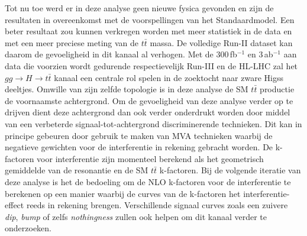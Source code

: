 Tot nu toe werd er in deze analyse geen nieuwe fysica gevonden en zijn
de resultaten in overeenkomst met de voorspellingen van het
Standaardmodel. Een beter resultaat zou kunnen verkregen worden met meer 
statistiek in de data en met een meer preciese meting van de $t \bar t$
massa. De volledige Run-II dataset kan daarom de gevoeligheid in dit kanaal al
verhogen. Met de 300\,fb$^{-1}$ en 3\,ab$^{-1}$ aan data die voorzien wordt
gedurende respectievelijk Run-III en de HL-LHC zal het $gg\rightarrow
H\rightarrow t\bar t$ kanaal een centrale rol spelen in de zoektocht naar
zware Higss deeltjes. Omwille van zijn zelfde topologie is in deze analyse 
de SM $t\bar t$ productie de voornaamste achtergrond. Om de gevoeligheid van
deze analyse verder op te drijven dient deze 
achtergrond dan ook verder onderdrukt worden door middel van een verbeterde
signaal-tot-achtergrond discriminerende technieken. Dit kan in principe gebeuren door
gebruik te maken van MVA 
technieken waarbij de negatieve gewichten voor de interferentie in rekening gebracht worden. 
De k-factoren voor interferentie zijn momenteel berekend als
het geometrisch gemiddelde van de resonantie en de SM $t \bar t$ k-factoren. Bij
de volgende iteratie van deze analyse is het de bedoeling 
om de NLO k-factoren voor de interferentie te
berekenen op een manier waarbij de curves van de k-factoren het
interferentie-effect reeds in rekening brengen. Verschillende signaal curves zoals
een zuivere {\it dip}, {\it bump} of zelfs {\it nothingness} zullen ook helpen om dit kanaal
verder te onderzoeken.  

\clearpage{\pagestyle{empty}\cleardoublepage}

